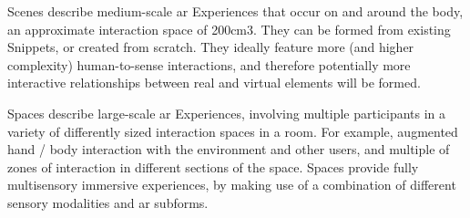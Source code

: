 Scenes describe medium-scale \gls{ar} Experiences that occur on and around the body, an approximate interaction space of 200cm3. They can be formed from existing Snippets, or created from scratch. They ideally feature more (and higher complexity) human-to-sense interactions, and therefore potentially more interactive relationships between real and virtual elements will be formed.

Spaces describe large-scale \gls{ar} Experiences, involving multiple participants in a variety of differently sized interaction spaces in a room. For example, augmented hand / body interaction with the environment and other users, and multiple of zones of interaction in different sections of the space. Spaces provide fully multisensory immersive experiences, by making use of a combination of different sensory modalities and \gls{ar} subforms.

